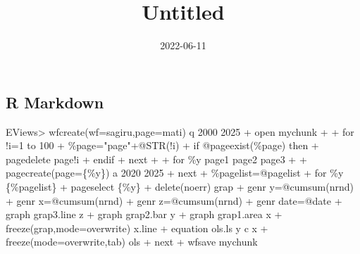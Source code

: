 \documentclass[
]{article}
\title{Untitled}
\author{}
\date{\vspace{-2.5em}2022-06-11}
\newenvironment{Shaded}{\begin{snugshade}}{\end{snugshade}}
\newcommand{\NormalTok}[1]{#1}
\begin{document}
\maketitle

{
\setcounter{tocdepth}{2}
\tableofcontents
}
\hypertarget{r-markdown}{%
\subsection{R Markdown}\label{r-markdown}}

\begin{Shaded}
\begin{Highlighting}[]
\NormalTok{EViews\textgreater{} wfcreate(wf=sagiru,page=mati) q 2000 2025}
\NormalTok{+ \textquotesingle{}open mychunk}
\NormalTok{+ }
\NormalTok{+ for !i=1 to 100}
\NormalTok{+ \%page="page"+@STR(!i)}
\NormalTok{+ if @pageexist(\%page) then}
\NormalTok{+ pagedelete page!i}
\NormalTok{+ endif}
\NormalTok{+ next}
\NormalTok{+ }
\NormalTok{+ for \%y page1 page2 page3  }
\NormalTok{+ }
\NormalTok{+ pagecreate(page=\{\%y\}) a 2020 2025}
\NormalTok{+ next}
\NormalTok{+ \%pagelist=@pagelist}
\NormalTok{+ for \%y \{\%pagelist\}}
\NormalTok{+ pageselect \{\%y\}}
\NormalTok{+ delete(noerr) grap}
\NormalTok{+ genr y=@cumsum(nrnd)}
\NormalTok{+ genr x=@cumsum(nrnd)}
\NormalTok{+ genr z=@cumsum(nrnd)}
\NormalTok{+ genr date=@date}
\NormalTok{+   graph grap3.line z   }
\NormalTok{+               graph grap2.bar y }
\NormalTok{+                           graph grap1.area x  }
\NormalTok{+    freeze(grap,mode=overwrite) x.line}
\NormalTok{+ equation ols.ls y c x}
\NormalTok{+ freeze(mode=overwrite,tab) ols}
\NormalTok{+ next}
\NormalTok{+ \textquotesingle{}wfsave mychunk}
\end{Highlighting}
\end{Shaded}
\end{document}
